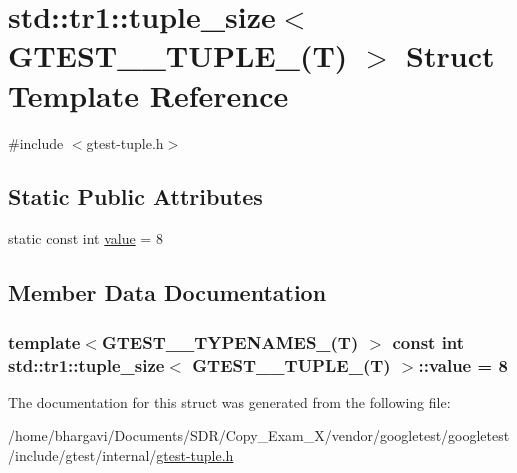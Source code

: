 \hypertarget{structstd_1_1tr1_1_1tuple__size_3_01_g_t_e_s_t__8___t_u_p_l_e___07_t_08_01_4}{}\section{std\+:\+:tr1\+:\+:tuple\+\_\+size$<$ G\+T\+E\+S\+T\+\_\+\_\+\+T\+U\+P\+L\+E\+\_\+(T) $>$ Struct Template Reference}
\label{structstd_1_1tr1_1_1tuple__size_3_01_g_t_e_s_t__8___t_u_p_l_e___07_t_08_01_4}


{\ttfamily \#include $<$gtest-\/tuple.\+h$>$}

\subsection*{Static Public Attributes}
\begin{DoxyCompactItemize}
\item 
static const int \hyperlink{structstd_1_1tr1_1_1tuple__size_3_01_g_t_e_s_t__8___t_u_p_l_e___07_t_08_01_4_a71abbf8156b1b110d3b8894ce02a44d8}{value} = 8
\end{DoxyCompactItemize}


\subsection{Member Data Documentation}
\subsubsection[{\texorpdfstring{value}{value}}]{\setlength{\rightskip}{0pt plus 5cm}template$<$G\+T\+E\+S\+T\+\_\+\_\+\+T\+Y\+P\+E\+N\+A\+M\+E\+S\+\_\+(\+T) $>$ const int {\bf std\+::tr1\+::tuple\+\_\+size}$<$ {\bf G\+T\+E\+S\+T\+\_\+\_\+\+T\+U\+P\+L\+E\+\_\+}(T) $>$\+::value = 8\hspace{0.3cm}{\ttfamily [static]}}\hypertarget{structstd_1_1tr1_1_1tuple__size_3_01_g_t_e_s_t__8___t_u_p_l_e___07_t_08_01_4_a71abbf8156b1b110d3b8894ce02a44d8}{}\label{structstd_1_1tr1_1_1tuple__size_3_01_g_t_e_s_t__8___t_u_p_l_e___07_t_08_01_4_a71abbf8156b1b110d3b8894ce02a44d8}


The documentation for this struct was generated from the following file\+:\begin{DoxyCompactItemize}
\item 
/home/bhargavi/\+Documents/\+S\+D\+R/\+Copy\+\_\+\+Exam\+\_\+X/vendor/googletest/googletest/include/gtest/internal/\hyperlink{gtest-tuple_8h}{gtest-\/tuple.\+h}\end{DoxyCompactItemize}
